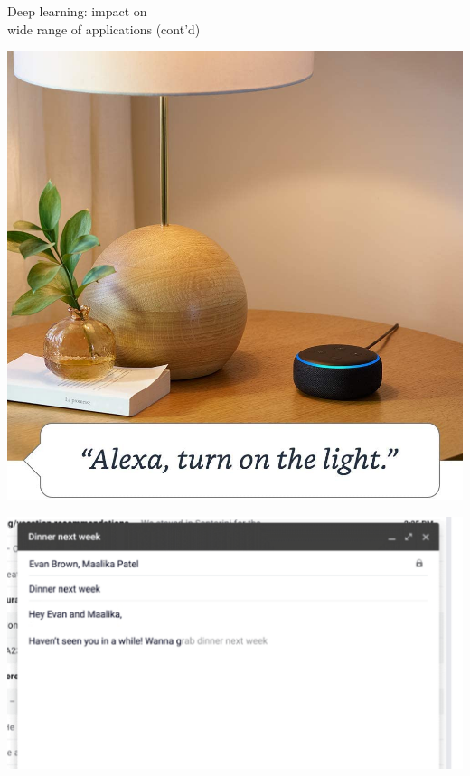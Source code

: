 \begin{frame}{Deep learning: impact on \\wide range of applications (cont'd)}
\begin{minipage}{0.35\linewidth}
\begin{center}
    \includegraphics[height=0.4\textheight]{figures/applications/alexa.jpg}
  \end{center}
\end{minipage}
\begin{minipage}{0.35\linewidth}
  \begin{center}
    \includegraphics[height=0.5\textheight]{figures/applications/smart-compose.png}
  \end{center}
\end{minipage}
\end{frame}

